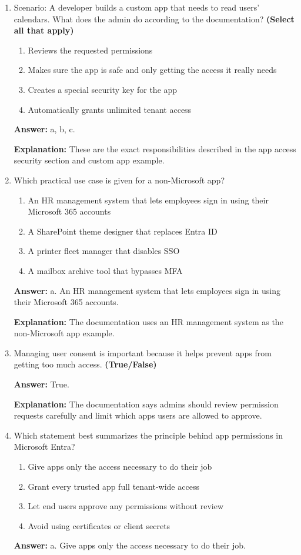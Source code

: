 \documentclass[10pt]{article}
\begin{document}
\begin{enumerate}[leftmargin=*]
\textbf{Explanation:} The documentation says apps use a client secret or a certificate to prove identity.

\item Scenario: A developer builds a custom app that needs to read users’ calendars. What does the admin do according to the documentation? \textbf{(Select all that apply)}
\begin{enumerate}[label=\alph*., leftmargin=1.5em]
\item Reviews the requested permissions
\item Makes sure the app is safe and only getting the access it really needs
\item Creates a special security key for the app
\item Automatically grants unlimited tenant access
\end{enumerate}
\textbf{Answer:} a, b, c.

\textbf{Explanation:} These are the exact responsibilities described in the app access security section and custom app example.

\item Which practical use case is given for a non-Microsoft app?
\begin{enumerate}[label=\alph*., leftmargin=1.5em]
\item An HR management system that lets employees sign in using their Microsoft 365 accounts
\item A SharePoint theme designer that replaces Entra ID
\item A printer fleet manager that disables SSO
\item A mailbox archive tool that bypasses MFA
\end{enumerate}
\textbf{Answer:} a. An HR management system that lets employees sign in using their Microsoft 365 accounts.

\textbf{Explanation:} The documentation uses an HR management system as the non-Microsoft app example.

\item Managing user consent is important because it helps prevent apps from getting too much access. \textbf{(True/False)}

\textbf{Answer:} True.

\textbf{Explanation:} The documentation says admins should review permission requests carefully and limit which apps users are allowed to approve.

\item Which statement best summarizes the principle behind app permissions in Microsoft Entra?
\begin{enumerate}[label=\alph*., leftmargin=1.5em]
\item Give apps only the access necessary to do their job
\item Grant every trusted app full tenant-wide access
\item Let end users approve any permissions without review
\item Avoid using certificates or client secrets
\end{enumerate}
\textbf{Answer:} a. Give apps only the access necessary to do their job.


\end{enumerate}
\end{document}

